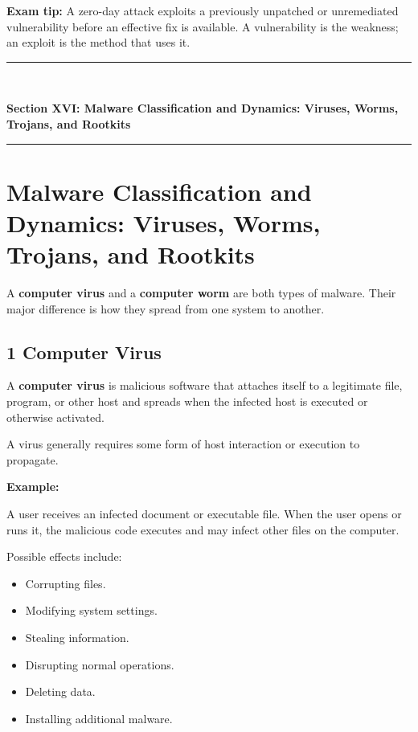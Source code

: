 \textbf{Exam tip:} A zero-day attack exploits a previously unpatched or unremediated vulnerability before an effective fix is available. A vulnerability is the weakness; an exploit is the method that uses it.


\newpage
\begin{center}
\vspace{0.5em}
{\color{primary}\rule{0.45\textwidth}{1.2pt}\\[4pt]}
{\Large\bfseries\color{primary} Section XVI: Malware Classification and Dynamics: Viruses, Worms, Trojans, and Rootkits\\[2pt]}
{\color{primary}\rule{0.45\textwidth}{1.2pt}}
\vspace{0.5em}
\end{center}

\section{Malware Classification and Dynamics: Viruses, Worms, Trojans, and Rootkits}


A \textbf{computer virus} and a \textbf{computer worm} are both types of malware. Their major difference is how they spread from one system to another.

\subsection{1 Computer Virus}

A \textbf{computer virus} is malicious software that attaches itself to a legitimate file, program, or other host and spreads when the infected host is executed or otherwise activated.

A virus generally requires some form of host interaction or execution to propagate.

\textbf{Example:}

A user receives an infected document or executable file. When the user opens or runs it, the malicious code executes and may infect other files on the computer.

Possible effects include:

\begin{itemize}
\item Corrupting files.
\item Modifying system settings.
\item Stealing information.
\item Disrupting normal operations.
\item Deleting data.
\item Installing additional malware.
\end{itemize}

